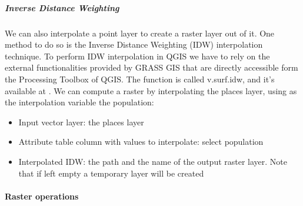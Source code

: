 \documentclass[letterpaper,10pt,english]{sphinxmanual}
\begin{document}
\subparagraph{Inverse Distance Weighting}
\label{\detokenize{vector/idw:inverse-distance-weighting}}\label{\detokenize{vector/idw::doc}}
We can also interpolate a point layer to create a raster layer out of it. One method to do so is the Inverse Distance Weighting (IDW)
interpolation technique. To perform IDW interpolation in QGIS we have to rely on the external functionalities provided by GRASS GIS that
are directly accessible form the Processing Toolbox of QGIS.
The function is called v.surf.idw, and it’s available at . We can compute a raster by interpolating
the places layer, using as the interpolation variable the population:
\begin{itemize}
\item {} 
Input vector layer: the places layer

\item {} 
Attribute table column with values to interpolate: select population

\item {} 
Interpolated IDW: the path and the name of the output raster layer. Note that if left empty a temporary layer will be created

\end{itemize}


\paragraph{Raster operations}
\label{\detokenize{raster/raster:raster-operations}}\label{\detokenize{raster/raster::doc}}
\end{document}
